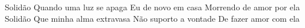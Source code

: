 \beginchorus
Solidão
Quando uma luz se apaga
Eu de novo em casa
Morrendo de amor por ela
Solidão
Que minha alma extravasa
Não suporto a vontade
De fazer amor com ela
\endchorus
{}
\vspace{4em} %
\begin{comment}
\lstset{basicstyle=\scriptsize\bf} %
\tab{Solo 1}
\begin{lstlisting}
E|-----------------------------------------------------|
B|-----------------------------------------------------|
G|-----------------------------------------------------|
D|-----------------------------------------------------|
A|-----------------------------------------------------|
E|-----------------------------------------------------|
\end{lstlisting}
\end{comment}
\begin{comment}

\color{drawChord}\gtab{\color{nameChord} X}{}%
\color{drawChord}\gtab{\color{nameChord} X}{}%
\color{drawChord}\gtab{\color{nameChord} X}{}%
\color{drawChord}\gtab{\color{nameChord} X}{}%

\end{comment}
\endsong
